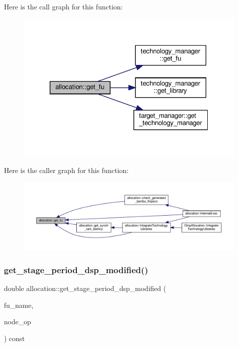 Here is the call graph for this function\+:
\nopagebreak
\begin{figure}[H]
\begin{center}
\leavevmode
\includegraphics[width=319pt]{d0/d74/classallocation_a15d6ddec8f9a3eb2f499481ef96525e0_cgraph}
\end{center}
\end{figure}
Here is the caller graph for this function\+:
\nopagebreak
\begin{figure}[H]
\begin{center}
\leavevmode
\includegraphics[width=350pt]{d0/d74/classallocation_a15d6ddec8f9a3eb2f499481ef96525e0_icgraph}
\end{center}
\end{figure}
\mbox{\label{classallocation_a6e86c7e93c8e3f957d1e152b3732fa44}} 
\subsubsection{\texorpdfstring{get\+\_\+stage\+\_\+period\+\_\+dsp\+\_\+modified()}{get\_stage\_period\_dsp\_modified()}}
{\footnotesize\ttfamily double allocation\+::get\+\_\+stage\+\_\+period\+\_\+dsp\+\_\+modified (\begin{DoxyParamCaption}\item[{const unsigned int}]{fu\+\_\+name,  }\item[{const \hyperlink{technology__node_8hpp_a33dd193b7bd6b987bf0d8a770a819fa7}{technology\+\_\+node\+Ref} \&}]{node\+\_\+op }\end{DoxyParamCaption}) const\hspace{0.3cm}{\ttfamily [protected]}}

